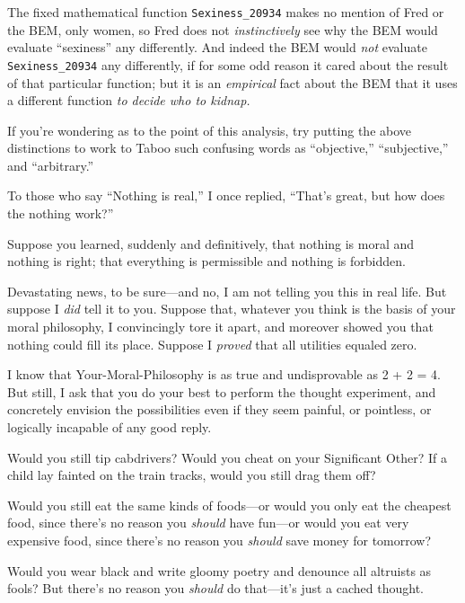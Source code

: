 {
 The fixed mathematical function \texttt{Sexiness\_20934} makes no mention
of Fred or the BEM, only women, so Fred does not \textit{instinctively}
see why the BEM would evaluate
``sexiness'' any differently. And
indeed the BEM would \textit{not} evaluate \texttt{Sexiness\_20934} any
differently, if for some odd reason it cared about the result of that
particular function; but it is an \textit{empirical} fact about the BEM
that it uses a different function \textit{to decide who to kidnap.}}

{
 If you're wondering as to the point of this
analysis, try putting the above distinctions to work to Taboo such
confusing words as ``objective,''
``subjective,'' and
``arbitrary.''}

\myendsectiontext


{
 To those who say ``Nothing is
real,'' I once replied,
``That's great, but how does the
nothing work?'' }

{
 Suppose you learned, suddenly and definitively, that nothing is
moral and nothing is right; that everything is permissible and nothing
is forbidden.}

{
 Devastating news, to be sure---and no, I am not telling you this
in real life. But suppose I \textit{did} tell it to you. Suppose that,
whatever you think is the basis of your moral philosophy, I
convincingly tore it apart, and moreover showed you that nothing could
fill its place. Suppose I \textit{proved} that all utilities equaled
zero.}

{
 I know that Your-Moral-Philosophy is as true and undisprovable as
2 + 2 = 4. But still, I ask that you do your best to perform the
thought experiment, and concretely envision the possibilities even if
they seem painful, or pointless, or logically incapable of any good
reply.}

{
 Would you still tip cabdrivers? Would you cheat on your
Significant Other? If a child lay fainted on the train tracks, would
you still drag them off?}

{
 Would you still eat the same kinds of foods---or would you only
eat the cheapest food, since there's no reason you
\textit{should} have fun---or would you eat very expensive food, since
there's no reason you \textit{should} save money for
tomorrow?}

{
 Would you wear black and write gloomy poetry and denounce all
altruists as fools? But there's no reason you
\textit{should} do that---it's just a cached thought.}

